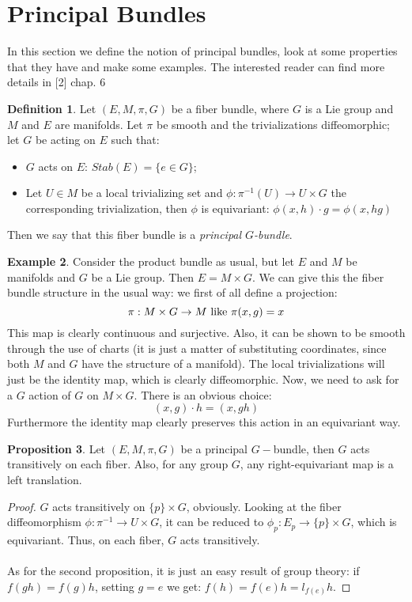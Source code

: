 \documentclass[12pt,a4paper]{report}
\theoremstyle{definition}
\newtheorem{Def}{Definition}[chapter]
\theoremstyle{Theorem}
\newtheorem{Prop}[Def]{Proposition}
\theoremstyle{definition}
\newtheorem{Ex}[Def]{Example}
\theoremstyle{definition}
\begin{document}
	\section{Principal Bundles}
	In this section we define the notion of principal bundles, look at some properties that they have and make some examples. The interested reader can find more details in [2] chap. 6
	\begin{Def}
		Let $(E,M,\pi,G)$ be a fiber bundle, where $G$ is a Lie group and $M$ and $E$ are manifolds. Let $\pi$ be smooth and the trivializations diffeomorphic; let $G$ be acting on $E$ such that:
		\begin{itemize}
			\item $G$ acts on $E$: $Stab(E)=\{e\in G\}$;
			\item Let $U\in M$ be a local trivializing set and $\phi:\pi^{-1}(U)\rightarrow U\times G$  the corresponding trivialization, then $\phi$ is equivariant: $\phi(x,h)\cdot g=\phi(x,hg)$
		\end{itemize} 
		Then we say that this fiber bundle is a \textit{principal $G$-bundle}.
	\end{Def}
	\begin{Ex}
		Consider the product bundle as usual, but let $E$ and $M$ be manifolds and $G$ be a Lie group. Then $E=M\times G$. We can give this the fiber bundle structure in the usual way: we first of all define a projection:
		$$\pi:M\times G\rightarrow M\hbox{ like }\pi(x,g)=x$$
		This map is clearly continuous and surjective. Also, it can be shown to be smooth through the use of charts (it is just a matter of substituting coordinates, since both $M$ and $G$ have the structure of a manifold). The local trivializations will just be the identity map, which is clearly diffeomorphic. Now, we need to ask for a $G$ action of $G$ on $M\times G$. There is an obvious choice:
		$$(x,g)\cdot h=(x,gh)$$
		Furthermore the identity map clearly preserves this action in an equivariant way.
	\end{Ex}
	\begin{Prop} \label{Prop_3.5.1}
		Let $(E,M,\pi,G)$ be a principal $G-$bundle, then $G$ acts transitively on each fiber. Also, for any group $G$, any right-equivariant map is a left translation.
	\end{Prop}
	\begin{proof}
		$G$ acts transitively on $\{p\} \times G$, obviously. Looking at the fiber diffeomorphism $\phi:\pi^{-1}\rightarrow U\times G$, it can be reduced to $\phi_p:E_p\rightarrow \{p\}\times G$, which is equivariant. Thus, on each fiber, $G$ acts transitively.\\
		\\
		As for the second proposition, it is just an easy result of group theory: if $f(gh)=f(g)h$, setting $g=e$ we get: $f(h)=f(e)h=l_{f(e)}h$.
	\end{proof}
\end{document}
